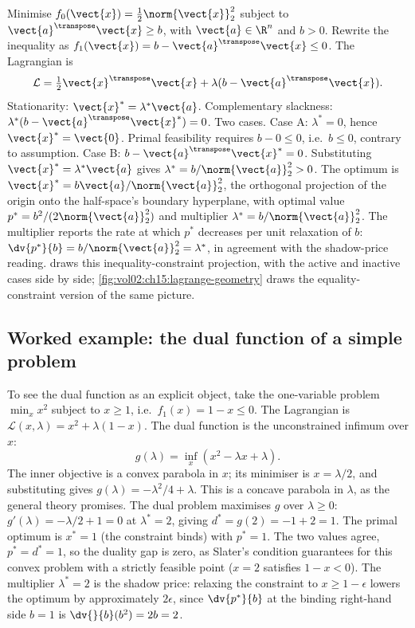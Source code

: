 Minimise $f_{0}(\vect{x}) = \tfrac{1}{2} \norm{\vect{x}}_{2}^{2}$
subject to $\vect{a}^{\transpose} \vect{x} \geq b$, with
$\vect{a} \in \R^{n}$ and $b > 0$. Rewrite the inequality as
$f_{1}(\vect{x}) = b - \vect{a}^{\transpose} \vect{x} \leq 0$. The
Lagrangian is
\[
\mathcal{L} = \tfrac{1}{2} \vect{x}^{\transpose} \vect{x} +
\lambda (b - \vect{a}^{\transpose} \vect{x}).
\]
Stationarity: $\vect{x}^{*} = \lambda^{*} \vect{a}$.
Complementary slackness: $\lambda^{*} (b - \vect{a}^{\transpose}
\vect{x}^{*}) = 0$. Two cases. Case A: $\lambda^{*} = 0$, hence
$\vect{x}^{*} = \vect{0}$. Primal feasibility requires $b - 0
\leq 0$, i.e.\ $b \leq 0$, contrary to assumption. Case B: $b -
\vect{a}^{\transpose} \vect{x}^{*} = 0$. Substituting
$\vect{x}^{*} = \lambda^{*} \vect{a}$ gives $\lambda^{*} = b /
\norm{\vect{a}}_{2}^{2} > 0$. The optimum is $\vect{x}^{*} = b
\vect{a} / \norm{\vect{a}}_{2}^{2}$, the orthogonal projection of
the origin onto the half-space's boundary hyperplane, with
optimal value $p^{*} = b^{2} / (2 \norm{\vect{a}}_{2}^{2})$ and
multiplier $\lambda^{*} = b / \norm{\vect{a}}_{2}^{2}$. The
multiplier reports the rate at which $p^{*}$ decreases per unit
relaxation of $b$: $\dv{p^{*}}{b} = b / \norm{\vect{a}}_{2}^{2} =
\lambda^{*}$, in agreement with the shadow-price reading.
 draws this inequality-constraint
projection, with the active and inactive cases side by side;
\cref{fig:vol02:ch15:lagrange-geometry} draws the
equality-constraint version of the same picture.





\subsection{Worked example: the dual function of a simple problem}

To see the dual function as an explicit object, take the
one-variable problem $\min_{x} x^{2}$ subject to $x \geq 1$, i.e.\
$f_{1}(x) = 1 - x \leq 0$. The Lagrangian is $\mathcal{L}(x,
\lambda) = x^{2} + \lambda(1 - x)$. The dual function is the
unconstrained infimum over $x$:
\[
g(\lambda) = \inf_{x} \left( x^{2} - \lambda x + \lambda \right).
\]
The inner objective is a convex parabola in $x$; its minimiser is
$x = \lambda/2$, and substituting gives $g(\lambda) = -\lambda^{2}/4
+ \lambda$. This is a concave parabola in $\lambda$, as the general
theory promises. The dual problem maximises $g$ over $\lambda \geq
0$: $g'(\lambda) = -\lambda/2 + 1 = 0$ at $\lambda^{*} = 2$, giving
$d^{*} = g(2) = -1 + 2 = 1$. The primal optimum is $x^{*} = 1$
(the constraint binds) with $p^{*} = 1$. The two values agree,
$p^{*} = d^{*} = 1$, so the duality gap is zero, as Slater's
condition guarantees for this convex problem with a strictly
feasible point ($x = 2$ satisfies $1 - x < 0$). The multiplier
$\lambda^{*} = 2$ is the shadow price: relaxing the constraint to
$x \geq 1 - \epsilon$ lowers the optimum by approximately
$2 \epsilon$, since $\dv{p^{*}}{b}$ at the binding right-hand side
$b = 1$ is $\dv{}{b}(b^{2}) = 2b = 2$.

